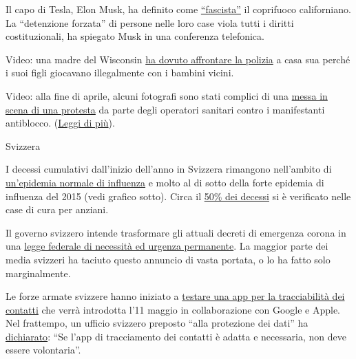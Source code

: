 Il capo di Tesla, Elon Musk, ha definito come
\href{https://www.theguardian.com/technology/2020/apr/29/tesla-quarterly-earnings-coronavirus-shares}{``fascista''}
il coprifuoco californiano. La ``detenzione forzata'' di persone nelle
loro case viola tutti i diritti costituzionali, ha spiegato Musk in una
conferenza telefonica.

Video: una madre del Wisconsin
\href{https://twitter.com/AlexBerenson/status/1256219418343981056}{ha
dovuto affrontare la polizia} a casa sua perché i suoi figli giocavano
illegalmente con i bambini vicini.

Video: alla fine di aprile, alcuni fotografi sono stati complici di una
\href{https://twitter.com/talialikeitis/status/1253126254942773248}{messa
in scena di una protesta} da parte degli operatori sanitari contro i
manifestanti antiblocco.
(\href{https://www.buzzfeednews.com/article/tasneemnashrulla/photos-denver-nurses-block-anti-lockdown-protest}{Leggi
di più}).

Svizzera

I decessi cumulativi dall'inizio dell'anno in Svizzera rimangono
nell'ambito di
\href{https://swprs.files.wordpress.com/2020/05/schweiz-todesfaelle-2010-2020_woche_17.pdf}{un'epidemia
normale di influenza} e molto al di sotto della forte epidemia di
influenza del 2015 (vedi grafico sotto). Circa il
\href{https://www.bluewin.ch/de/news/schweiz/sp-chef-levrat-will-die-reichen-schropfen-383977.html}{50\%
dei decessi} si è verificato nelle case di cura per anziani.

Il governo svizzero intende trasformare gli attuali decreti di emergenza
corona in una
\href{https://www.admin.ch/gov/de/start/dokumentation/medienmitteilungen.msg-id-78929.html}{legge
federale di necessità ed urgenza permanente}. La maggior parte dei media
svizzeri ha taciuto questo annuncio di vasta portata, o lo ha fatto solo
marginalmente.

Le forze armate svizzere hanno iniziato a
\href{https://uncut-news.ch/wp-content/uploads/2020/05/Schweizer-Soldaten-k\%C3\%A4mpfen-bewaffnet-mit-Bluetooth-App-gegen-COVID-19.pdf}{testare
una app per la tracciabilità dei contatti} che verrà introdotta l'11
maggio in collaborazione con Google e Apple. Nel frattempo, un ufficio
svizzero preposto ``alla protezione dei dati'' ha
\href{https://www.nzz.ch/zuerich/coronavirus-in-zuerich-tracing-app-braucht-keine-freiwilligkeit-ld.1553964}{dichiarato}:
``Se l'app di tracciamento dei contatti è adatta e necessaria, non deve
essere volontaria''.

